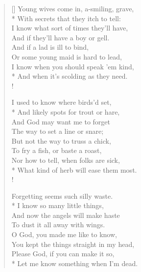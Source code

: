 \documentclass[MAIN]{subfiles}
\begin{document}
\begin{verse}[\versewidth]
Young wives come in, a-smiling, grave,\\*
\vin With secrets that they itch to tell:\\
I know what sort of times they'll have,\\
\vin And if they'll have a boy or gell.\\
And if a lad is ill to bind,\\
\vin Or some young maid is hard to lead,\\
I know when you should speak 'em kind,\\*
\vin And when it's scolding as they need.\\!

I used to know where birds'd set,\\*
\vin And likely spots for trout or hare,\\
And God may want me to forget\\
\vin The way to set a line or snare;\\
But not the way to truss a chick,\\
\vin To fry a fish, or baste a roast,\\
Nor how to tell, when folks are sick,\\*
\vin What kind of herb will ease them most.\\!

Forgetting seems such silly waste.\\*
\vin I know so many little things,\\
And now the angels will make haste\\
\vin To dust it all away with wings.\\
O God, you made me like to know,\\
\vin You kept the things straight in my head,\\
Please God, if you can make it so,\\*
\vin Let me know something when I'm dead.
\end{verse}
\end{document}

